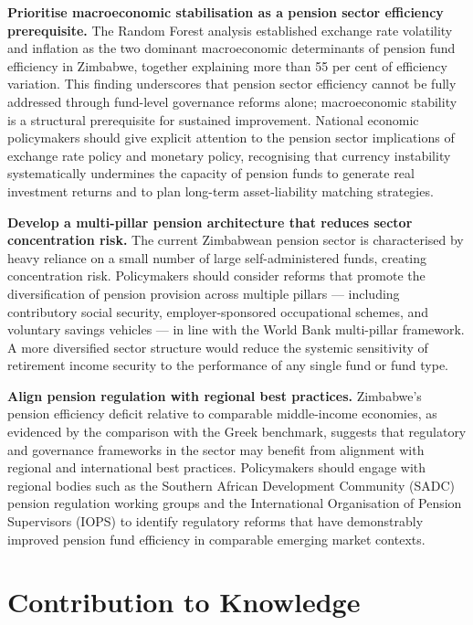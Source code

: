 \documentclass[12pt,a4paper]{article}
\begin{document}
\textbf{Prioritise macroeconomic stabilisation as a pension sector efficiency prerequisite.} The Random Forest analysis established exchange rate volatility and inflation as the two dominant macroeconomic determinants of pension fund efficiency in Zimbabwe, together explaining more than 55 per cent of efficiency variation. This finding underscores that pension sector efficiency cannot be fully addressed through fund-level governance reforms alone; macroeconomic stability is a structural prerequisite for sustained improvement. National economic policymakers should give explicit attention to the pension sector implications of exchange rate policy and monetary policy, recognising that currency instability systematically undermines the capacity of pension funds to generate real investment returns and to plan long-term asset-liability matching strategies.

\textbf{Develop a multi-pillar pension architecture that reduces sector concentration risk.} The current Zimbabwean pension sector is characterised by heavy reliance on a small number of large self-administered funds, creating concentration risk. Policymakers should consider reforms that promote the diversification of pension provision across multiple pillars --- including contributory social security, employer-sponsored occupational schemes, and voluntary savings vehicles --- in line with the World Bank multi-pillar framework. A more diversified sector structure would reduce the systemic sensitivity of retirement income security to the performance of any single fund or fund type.

\textbf{Align pension regulation with regional best practices.} Zimbabwe's pension efficiency deficit relative to comparable middle-income economies, as evidenced by the comparison with the Greek benchmark, suggests that regulatory and governance frameworks in the sector may benefit from alignment with regional and international best practices. Policymakers should engage with regional bodies such as the Southern African Development Community (SADC) pension regulation working groups and the International Organisation of Pension Supervisors (IOPS) to identify regulatory reforms that have demonstrably improved pension fund efficiency in comparable emerging market contexts.

\section{Contribution to Knowledge}
\end{document}
